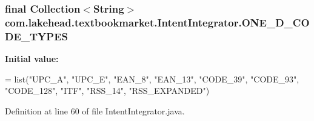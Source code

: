 \hypertarget{classcom_1_1lakehead_1_1textbookmarket_1_1_intent_integrator_a3d32a0aa67ddbff0366398812cf33290}{
\subsubsection[{O\-N\-E\-\_\-\-D\-\_\-\-C\-O\-D\-E\-\_\-\-T\-Y\-P\-E\-S}]{\setlength{\rightskip}{0pt plus 5cm}final Collection$<$String$>$ com.\-lakehead.\-textbookmarket.\-Intent\-Integrator.\-O\-N\-E\-\_\-\-D\-\_\-\-C\-O\-D\-E\-\_\-\-T\-Y\-P\-E\-S\hspace{0.3cm}{\ttfamily [static]}}}\label{classcom_1_1lakehead_1_1textbookmarket_1_1_intent_integrator_a3d32a0aa67ddbff0366398812cf33290}
{\bfseries Initial value\-:}
\begin{DoxyCode}
=
            list(\textcolor{stringliteral}{"UPC\_A"}, \textcolor{stringliteral}{"UPC\_E"}, \textcolor{stringliteral}{"EAN\_8"}, \textcolor{stringliteral}{"EAN\_13"}, \textcolor{stringliteral}{"CODE\_39"}, \textcolor{stringliteral}{"CODE\_93"}, \textcolor{stringliteral}{"CODE\_128"},
                    \textcolor{stringliteral}{"ITF"}, \textcolor{stringliteral}{"RSS\_14"}, \textcolor{stringliteral}{"RSS\_EXPANDED"})
\end{DoxyCode}


Definition at line 60 of file Intent\-Integrator.\-java.

